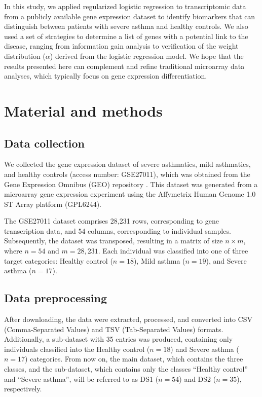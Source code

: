 In this study, we applied regularized logistic regression to transcriptomic data from a publicly available gene expression dataset to identify biomarkers that can distinguish between patients with severe asthma and healthy controls. We also used a set of strategies to determine a list of genes with a potential link to the disease, ranging from information gain analysis to verification of the weight distribution ($\alpha$) derived from the logistic regression model. We hope that the results presented here can complement and refine traditional microarray data analyses, which typically focus on gene expression differentiation.

\section{Material and methods}

\subsection{Data collection}

We collected the gene expression dataset of severe asthmatics, mild asthmatics, and healthy controls (access number: GSE27011), which was obtained from the Gene Expression Omnibus (GEO) repository %
\cite{orsmark-pietras_transcriptome_2013}. This dataset was generated from a microarray gene expression experiment using the Affymetrix Human Genome 1.0 ST Array platform (GPL6244). 

The GSE27011 dataset comprises 28,231 rows, corresponding to gene transcription data, and 54 columns, corresponding to individual samples. Subsequently, the dataset was transposed, resulting in a matrix of size $n \times m$, where $n = 54$ and $m = 28,231$. Each individual was classified into one of three target categories: Healthy control ($n = 18$), Mild asthma ($n = 19$), and Severe asthma ($n = 17$).

\subsection{Data preprocessing}

After downloading, the data were extracted, processed, and converted into CSV (Comma-Separated Values) and TSV (Tab-Separated Values) formats. Additionally, a sub-dataset with 35 entries was produced, containing only individuals classified into the Healthy control ($n = 18$) and Severe asthma ($n = 17$) categories. From now on, the main dataset, which contains the three classes, and the sub-dataset, which contains only the classes ``Healthy control'' and ``Severe asthma'', will be referred to as DS1 ($n = 54$) and DS2 ($n = 35$), respectively.

